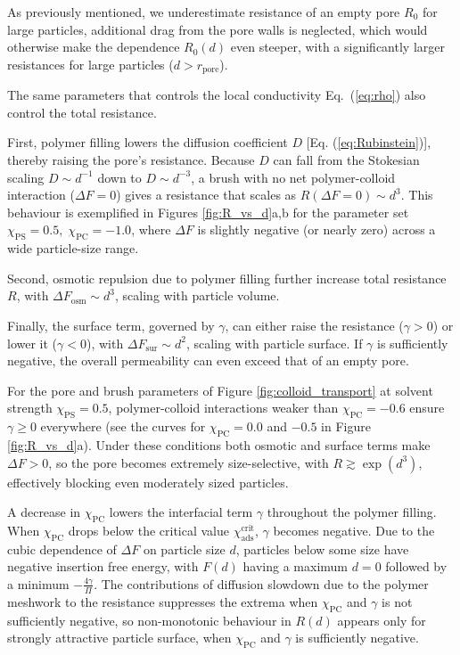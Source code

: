 \documentclass[12pt, a4paper]{article}
\newcommand\todo[1]{\textcolor{red}{#1}}
\begin{document}
As previously mentioned, we underestimate resistance of an empty pore $R_0$ for large particles,
additional drag from the pore walls is neglected, which would otherwise make the dependence $R_0(d)$ even steeper, with a significantly larger resistances for large particles ($d > r_{\text{pore}}$).

The same parameters that controls the local conductivity Eq.~(\ref{eq:rho}) also control the total resistance.

First, polymer filling lowers the diffusion coefficient $D$ [Eq. (\ref{eq:Rubinstein})], thereby raising the pore’s resistance.
Because $D$ can fall from the Stokesian scaling $D \sim d^{-1}$ down to $D \sim d^{-3}$, a brush with no net polymer-colloid interaction ($\Delta F=0$) gives a resistance that scales as $R(\Delta F=0)\sim d^{3}$.
This behaviour is exemplified in Figures \ref{fig:R_vs_d}a,b for the parameter set $\chi_{\text{PS}}=0.5,\;\chi_{\text{PC}}=-1.0$, where $\Delta F$ is slightly negative (or nearly zero) across a wide particle-size range.

Second, osmotic repulsion due to polymer filling further increase total resistance $R$, with $\Delta F_{\text{osm}} \sim d^3$, scaling with particle volume.

Finally, the surface term, governed by $\gamma$, can either raise the resistance ($\gamma>0$) or lower it ($\gamma<0$), with $\Delta F_{\text{sur}} \sim d^2$, scaling with particle surface.
If $\gamma$ is sufficiently negative, the overall permeability can even exceed that of an empty pore.

For the pore and brush parameters of Figure \ref{fig:colloid_transport} at solvent strength $\chi_{\text{PS}}=0.5$, polymer-colloid interactions weaker than $\chi_{\text{PC}}=-0.6$ ensure $\gamma\ge0$ everywhere (see the curves for $\chi_{\text{PC}}=0.0$ and $-0.5$ in Figure \ref{fig:R_vs_d}a).
Under these conditions both osmotic and surface terms make $\Delta F>0$, so the pore becomes extremely size-selective, with $R\gtrsim\exp(d^{3})$, effectively blocking even moderately sized particles.


A decrease in $\chi_{\text{PC}}$
lowers the interfacial term $\gamma$ throughout the polymer filling.
When $\chi_{\text{PC}}$ drops below the critical value $\chi_{\text{ads}}^{\text{crit}}$, $\gamma$ becomes negative.
Due to the cubic dependence of $\Delta F$ on particle size $d$, particles below some size have negative insertion free energy, with $F(d)$ having a maximum $d=0$ followed by a minimum $-\tfrac{4\gamma}{\Pi}$.
The contributions of diffusion slowdown due to the polymer meshwork to the resistance suppresses the extrema when $\chi_{\text{PC}}$ and $\gamma$ is not sufficiently negative, so non-monotonic behaviour in $R(d)$ appears only for strongly attractive particle surface, when $\chi_{\text{PC}}$ and $\gamma$ is sufficiently negative.
\end{document}
